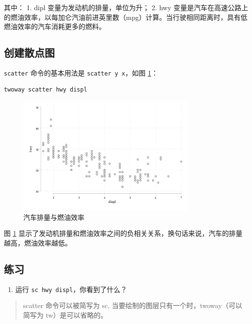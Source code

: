 \documentclass[]{ctexbook}
\providecommand{\tightlist}{%
  \setlength{\itemsep}{0pt}\setlength{\parskip}{0pt}}
\begin{document}
其中：
1. dipl 变量为发动机的排量，单位为升；
2. hwy 变量是汽车在高速公路上的燃油效率，以每加仑汽油前进英里数（mpg）计算。当行驶相同距离时，具有低燃油效率的汽车消耗更多的燃料。

\hypertarget{section-29}{%
\subsection{创建散点图}\label{section-29}}

\texttt{scatter} 命令的基本用法是 \texttt{scatter\ y\ x}，如图 \ref{fig:hwydispl}：

\begin{lstlisting}
twoway scatter hwy displ
\end{lstlisting}

\begin{figure}

{\centering \includegraphics[width=0.8\textwidth]{assets/hwydispl} 

}

\caption{汽车排量与燃油效率}\label{fig:hwydispl}
\end{figure}

图 \ref{fig:hwydispl} 显示了发动机排量和燃油效率之间的负相关关系，换句话来说，汽车的排量越高，燃油效率越低。

\hypertarget{section-30}{%
\subsection{练习}\label{section-30}}

\begin{enumerate}
\def\labelenumi{\arabic{enumi}.}
\tightlist
\item
  运行 \texttt{sc\ hwy\ displ}，你看到了什么？
\end{enumerate}

\begin{quote}
scatter 命令可以被简写为 sc, 当要绘制的图层只有一个时，twoway（可以简写为 tw）是可以省略的。
\end{quote}
\end{document}
